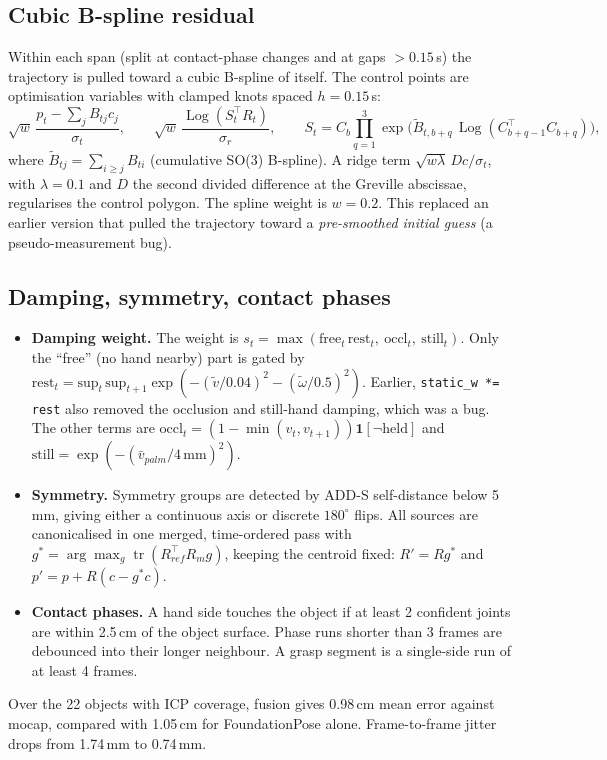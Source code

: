 \documentclass[10pt,a4paper]{article}
\newcommand{\Log}{\operatorname{Log}}
\begin{document}
\subsection{Cubic B-spline residual}
Within each span (split at contact-phase changes and at gaps $>0.15$\,s) the trajectory is pulled toward a
cubic B-spline of itself. The control points are optimisation variables with clamped knots spaced $h=0.15$\,s:
\begin{equation}
\sqrt{w}\,\frac{p_t-\sum_j B_{tj}c_j}{\sigma_t},\qquad
\sqrt{w}\,\frac{\Log(S_t^\top R_t)}{\sigma_r},\qquad
S_t=C_b\prod_{q=1}^{3}\exp\!\Big(\tilde B_{t,b+q}\,\Log(C_{b+q-1}^\top C_{b+q})\Big),
\end{equation}
where $\tilde B_{tj}=\sum_{i\ge j}B_{ti}$ (cumulative SO(3) B-spline). A ridge term $\sqrt{w\lambda}\,Dc/\sigma_t$, with $\lambda=0.1$ and $D$
the second divided difference at the Greville abscissae, regularises the control polygon. The spline weight is $w=0.2$.
This replaced an earlier version that pulled the trajectory toward a \emph{pre-smoothed initial guess} (a pseudo-measurement bug).

\subsection{Damping, symmetry, contact phases}
\begin{itemize}
\item \textbf{Damping weight.} The weight is $s_t=\max(\mathrm{free}_t\,\mathrm{rest}_t,\ \mathrm{occl}_t,\ \mathrm{still}_t)$. Only the
``free'' (no hand nearby) part is gated by
$\mathrm{rest}_t=\mathrm{sup}_t\,\mathrm{sup}_{t+1}\exp(-(\tilde v/0.04)^2-(\tilde\omega/0.5)^2)$. Earlier,
\texttt{static\_w *= rest} also removed the occlusion and still-hand damping, which was a bug.
The other terms are $\mathrm{occl}_t=(1-\min(v_t,v_{t+1}))\mathbf 1[\neg\mathrm{held}]$ and $\mathrm{still}=\exp(-(\bar v_{palm}/4\,\mathrm{mm})^2)$.
\item \textbf{Symmetry.} Symmetry groups are detected by ADD-S self-distance below 5\,mm, giving either a continuous axis or discrete $180^\circ$ flips.
All sources are canonicalised in one merged, time-ordered pass with $g^*=\arg\max_g\operatorname{tr}(R_{ref}^\top R_m g)$, keeping the centroid fixed:
$R'=Rg^*$ and $p'=p+R(c-g^*c)$.
\item \textbf{Contact phases.} A hand side touches the object if at least 2 confident joints are within 2.5\,cm of the object surface. Phase runs shorter than 3 frames are debounced into
their longer neighbour. A grasp segment is a single-side run of at least 4 frames.
\end{itemize}
Over the 22 objects with ICP coverage, fusion gives 0.98\,cm mean error against mocap, compared with 1.05\,cm for FoundationPose alone. Frame-to-frame jitter
drops from 1.74\,mm to 0.74\,mm.
\end{document}
